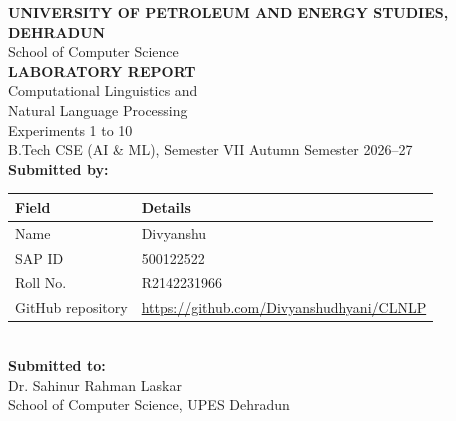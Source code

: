 \documentclass[12pt,a4paper,oneside]{report}
\renewcommand{\arraystretch}{1.15}
\begin{document}
\begin{titlepage}
\centering
{\Large\bfseries UNIVERSITY OF PETROLEUM AND ENERGY STUDIES,\\[2pt] DEHRADUN}\\[8pt]
{\large School of Computer Science}\\[2.2cm]
{\Huge\bfseries LABORATORY REPORT}\\[0.8cm]
{\LARGE Computational Linguistics and\\[4pt] Natural Language Processing}\\[0.6cm]
{\Large Experiments 1 to 10}\\[0.8cm]
{\large B.Tech CSE (AI \& ML), Semester VII \textbar{} Autumn Semester 2026--27}\\[2.2cm]
{\large\bfseries Submitted by:}\\[8pt]
\renewcommand{\arraystretch}{1.5}
\begin{tabular}{@{}p{3.6cm}p{9cm}@{}}
\toprule
\textbf{Field} & \textbf{Details}\\\midrule
Name & Divyanshu\\
SAP ID & 500122522\\
Roll No. & R2142231966\\
GitHub repository & \url{https://github.com/Divyanshudhyani/CLNLP}\\\bottomrule
\end{tabular}\\[2cm]
{\large\bfseries Submitted to:}\\[6pt]
{\large Dr. Sahinur Rahman Laskar}\\
School of Computer Science, UPES Dehradun
\end{titlepage}
\tableofcontents
\clearpage
\end{document}
